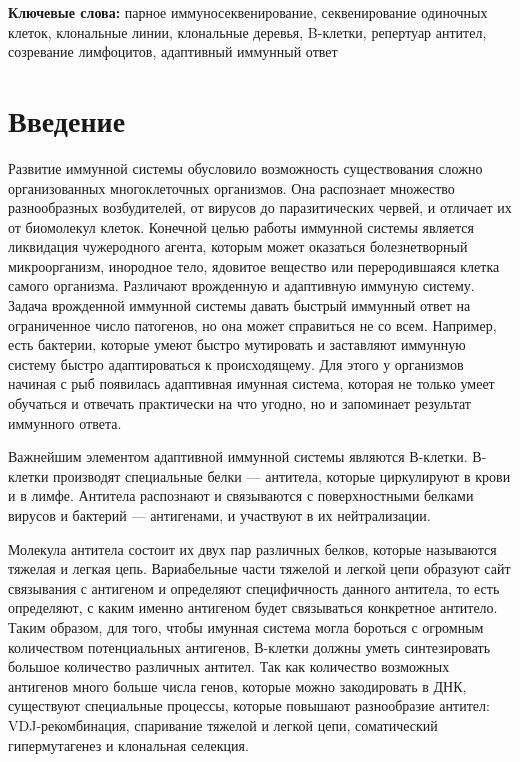 \documentclass{spbau-diploma}
\begin{document}
\textbf{Ключевые слова:} парное иммуносеквенирование, секвенирование одиночных клеток, клональные линии, клональные деревья, B-клетки, репертуар антител, созревание лимфоцитов, адаптивный иммунный ответ


\section{Введение}

Развитие иммунной системы обусловило возможность существования сложно организованных многоклеточных организмов. Она распознает множество разнообразных возбудителей, от вирусов до паразитических червей, и отличает их от биомолекул клеток. Конечной целью работы иммунной системы является ликвидация чужеродного агента, которым может оказаться болезнетворный микроорганизм, инородное тело, ядовитое вещество или переродившаяся клетка самого организма. Различают врожденную и адаптивную иммуную систему. Задача врожденной иммунной системы давать быстрый иммунный ответ на ограниченное число патогенов, но она может справиться не со всем. Например, есть бактерии, которые умеют быстро мутировать и заставляют иммунную систему быстро адаптироваться к происходящему. Для этого у организмов начиная с рыб появилась адаптивная имунная система, которая не только умеет обучаться и отвечать практически на что угодно, но и запоминает результат иммунного ответа. 

Важнейшим элементом адаптивной иммунной системы являются В-клетки. В-клетки производят специальные белки ---  антитела, которые циркулируют в крови и в лимфе. Антитела распознают и связываются с поверхностными белками вирусов и бактерий --- антигенами, и участвуют в их нейтрализации.  

Молекула антитела состоит их двух пар различных белков, которые называются тяжелая и легкая цепь.  Вариабельные части тяжелой и легкой цепи образуют сайт связывания с антигеном и определяют специфичность данного антитела, то есть определяют, с каким именно антигеном будет связываться конкретное антитело. Таким образом, для того, чтобы имунная система могла бороться с огромным количеством потенциальных антигенов, В-клетки должны уметь синтезировать большое количество различных антител. Так как количество возможных антигенов много больше числа генов, которые можно закодировать в ДНК, существуют специальные процессы, которые повышают разнообразие антител: VDJ-рекомбинация, спаривание тяжелой и легкой цепи, соматический гипермутагенез и клональная селекция. 
\end{document}
